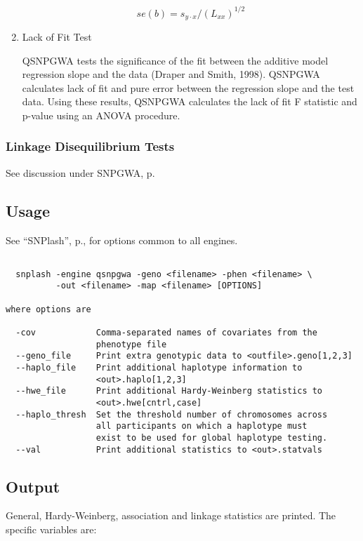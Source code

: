 \begin{enumerate}
    \begin{equation*}
      se(b) = s_{y\cdot{}x}/\left(L_{xx}\right)^{1/2}
    \end{equation*}

  \item{Lack of Fit Test}
    
    QSNPGWA tests the significance of the fit between the additive model
    regression slope and the data (Draper and Smith, 1998).
    QSNPGWA calculates lack of fit and pure error between the regression slope
    and the test data.  Using these results, QSNPGWA calculates the lack of fit
    F statistic and p-value using an ANOVA procedure.

\end{enumerate}

\subsubsection{Linkage Disequilibrium Tests}
See discussion under SNPGWA, p.\pageref{sec:linkage-dis}

\subsection{Usage}
See ``SNPlash'', p.\pageref{sec:snplash}, for options common to all engines.

\begin{verbatim}

  snplash -engine qsnpgwa -geno <filename> -phen <filename> \
          -out <filename> -map <filename> [OPTIONS]

where options are

  -cov            Comma-separated names of covariates from the
                  phenotype file
  --geno_file     Print extra genotypic data to <outfile>.geno[1,2,3]
  --haplo_file    Print additional haplotype information to
                  <out>.haplo[1,2,3]
  --hwe_file      Print additional Hardy-Weinberg statistics to
                  <out>.hwe[cntrl,case]
  --haplo_thresh  Set the threshold number of chromosomes across
                  all participants on which a haplotype must 
                  exist to be used for global haplotype testing.
  --val           Print additional statistics to <out>.statvals

\end{verbatim}

\subsection{Output}
General, Hardy-Weinberg, association and linkage statistics are printed.  The
specific  variables are:

